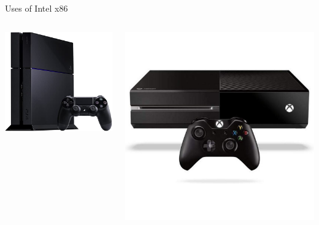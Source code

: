 \begin{frame}{Uses of Intel x86}
\begin{columns}
\begin{column}{0.32\textwidth}
			\pause\includegraphics[width=\textwidth]{ps4}
		\end{column}
		\begin{column}{0.32\textwidth}
			\pause\includegraphics[width=\textwidth]{xbox_one}
		\end{column}
	\end{columns}
\end{frame}

